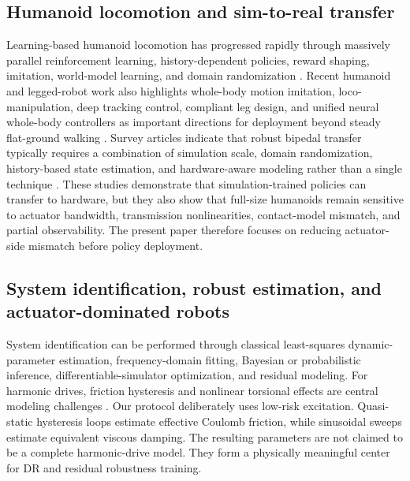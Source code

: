 \documentclass[twoside,final,1p,times]{elsarticle}
\newcommand{\minorrev}[1]{#1}
\begin{document}
\subsection{Humanoid locomotion and sim-to-real transfer}
Learning-based humanoid locomotion has progressed rapidly through massively parallel reinforcement learning, history-dependent policies, reward shaping, imitation, world-model learning, and domain randomization \minorrev{\citep{siekmann2021periodic,rudin2022minutes,margolis2024rapid,radosavovic2024realworld,haarnoja2024agile,li2025versatile,gu2024dwl,he2024agilebutsafe}}. Recent humanoid and legged-robot work also highlights whole-body motion imitation, loco-manipulation, deep tracking control, compliant leg design, and unified neural whole-body controllers as important directions for deployment beyond steady flat-ground walking \minorrev{\citep{jenelten2024dtc,dao2024box,tang2024humanmimic,he2025hover,hoeller2024anymal,chen2025curating}}. Survey articles indicate that robust bipedal transfer typically requires a combination of simulation scale, domain randomization, history-based state estimation, and hardware-aware modeling rather than a single technique \minorrev{\citep{ha2025legged,bao2025bipedal}}. These studies demonstrate that simulation-trained policies can transfer to hardware, but they also show that full-size humanoids remain sensitive to actuator bandwidth, transmission nonlinearities, contact-model mismatch, and partial observability. The present paper therefore focuses on reducing actuator-side mismatch before policy deployment.

\subsection{System identification, robust estimation, and actuator-dominated robots}
System identification can be performed through classical least-squares dynamic-parameter estimation, frequency-domain fitting, Bayesian or probabilistic inference, differentiable-simulator optimization, and residual modeling. For harmonic drives, friction hysteresis and nonlinear torsional effects are central modeling challenges \minorrev{\citep{preissner2012highfidelity,tjahjowidodo2013torsional,wang2024hysteresis,zhang2025elastic,turlapati2024friction,piatkowski2024spline}}. Our protocol deliberately uses low-risk excitation. Quasi-static hysteresis loops estimate effective Coulomb friction, while sinusoidal sweeps estimate equivalent viscous damping. The resulting parameters are not claimed to be a complete harmonic-drive model. They form a physically meaningful center for DR and residual robustness training.
\end{document}
